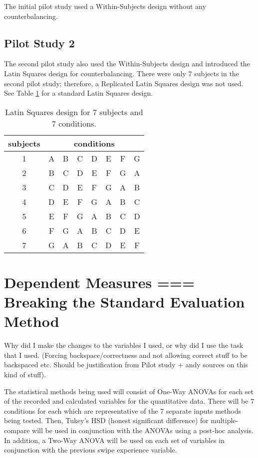 The initial pilot study used a Within-Subjects design without any counterbalancing.

\subsection{Pilot Study 2}

The second pilot study also used the Within-Subjects design and introduced the Latin Squares design for counterbalancing. There were only 7 subjects in the second pilot study; therefore, a Replicated Latin Squares design was not used. See Table \ref{table_latin_squares_no_reps} for a standard Latin Squares design.

\begin{table}[h] %
\centering
\caption[Latin Squares Design with No Replications]{\centering Latin Squares design for 7 subjects and 7 conditions.}
\label{table_latin_squares_no_reps}
\begin{tabular}{c | c c c c c c c}
    \hline
    subjects & \multicolumn{7}{c}{conditions} \\
    \hline
    1 & A & B & C & D & E & F & G \\
    2 & B & C & D & E & F & G & A \\
    3 & C & D & E & F & G & A & B \\
    4 & D & E & F & G & A & B & C \\
    5 & E & F & G & A & B & C & D \\
    6 & F & G & A & B & C & D & E \\
    7 & G & A & B & C & D & E & F \\
    \hline
\end{tabular}
\end{table}

\section{Dependent Measures === Breaking the Standard Evaluation Method}

Why did I make the changes to the variables I used, or why did I use the task that I used. (Forcing backspace/correctness and not allowing correct stuff to be backspaced etc. Should be justification from Pilot study + andy sources on this kind of stuff).

The statistical methods being used will consist of One-Way ANOVAs for each set of the recorded and calculated variables for the quantitative data. There will be 7 conditions for each which are representative of the 7 separate inputs methods being tested. Then, Tukey's HSD (honest significant difference) for multiple-compare will be used in conjunction with the ANOVAs using a post-hoc analysis. In addition, a Two-Way ANOVA will be used on each set of variables in conjunction with the previous swipe experience variable.

